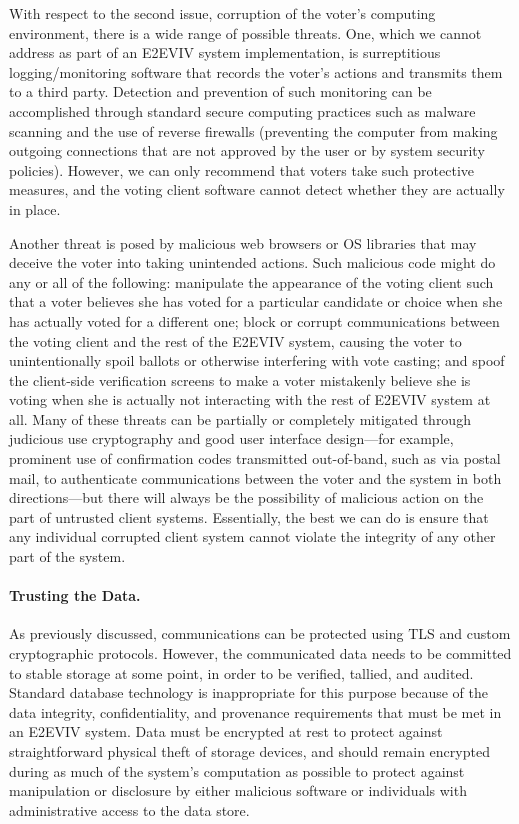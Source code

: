 With respect to the second issue, corruption of the voter's computing
environment, there is a wide range of possible threats. One, which we
cannot address as part of an E2EVIV system implementation, is
surreptitious logging/monitoring software that records the voter's
actions and transmits them to a third party. Detection and prevention
of such monitoring can be accomplished through standard secure
computing practices such as malware scanning and the use of reverse
firewalls (preventing the computer from making outgoing connections
that are not approved by the user or by system security
policies). However, we can only recommend that voters take such
protective measures, and the voting client software cannot detect
whether they are actually in place.

Another threat is posed by malicious web browsers or OS libraries that
may deceive the voter into taking unintended actions. Such malicious
code might do any or all of the following: manipulate the appearance
of the voting client such that a voter believes she has voted for a
particular candidate or choice when she has actually voted for a
different one; block or corrupt communications between the voting
client and the rest of the E2EVIV system, causing the voter to
unintentionally spoil ballots or otherwise interfering with vote
casting; and spoof the client-side verification screens to make a
voter mistakenly believe she is voting when she is actually not
interacting with the rest of E2EVIV system at all. Many of these
threats can be partially or completely mitigated through judicious use
cryptography and good user interface design---for example, prominent
use of confirmation codes transmitted out-of-band, such as via postal
mail, to authenticate communications between the voter and the system
in both directions---but there will always be the possibility of
malicious action on the part of untrusted client systems. Essentially,
the best we can do is ensure that any individual corrupted client
system cannot violate the integrity of any other part of the system.

\paragraph{Trusting the Data.} As previously discussed, communications
can be protected using TLS and custom cryptographic protocols.
However, the communicated data needs to be committed to stable storage
at some point, in order to be verified, tallied, and audited. Standard
database technology is inappropriate for this purpose because of the
data integrity, confidentiality, and provenance requirements that must
be met in an E2EVIV system. Data must be encrypted at rest to protect
against straightforward physical theft of storage devices, and should
remain encrypted during as much of the system's computation as
possible to protect against manipulation or disclosure by either
malicious software or individuals with administrative access to the
data store.

